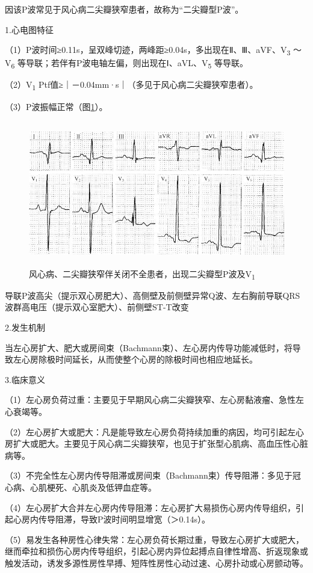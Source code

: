 因该P波常见于风心病二尖瓣狭窄患者，故称为“二尖瓣型P波”。

1.心电图特征

（1）P波时间≥0.11s，呈双峰切迹，两峰距≥0.04s，多出现在Ⅱ、Ⅲ、aVF、V\textsubscript{3}
～V\textsubscript{6}
等导联；若伴有P波电轴左偏，则出现在Ⅰ、aVL、V\textsubscript{5} 等导联。

（2）V\textsubscript{1}
Ptf值≥｜－0.04mm·s｜（多见于风心病二尖瓣狭窄患者）。

（3）P波振幅正常（图\ref{fig1-2}）。

\begin{figure}[!htbp]
 \centering
 \includegraphics[width=5.19792in,height=2.5in]{./images/Image00007.jpg}
 \captionsetup{justification=centering}
 \caption{风心病、二尖瓣狭窄伴关闭不全患者，出现二尖瓣型P波及V\textsubscript{1}}
 \label{fig1-2}
  \end{figure} 
导联P波高尖（提示双心房肥大）、高侧壁及前侧壁异常Q波、左右胸前导联QRS波群高电压（提示双心室肥大）、前侧壁ST-T改变

2.发生机制

当左心房扩大、肥大或房间束（Bachmann束）、左心房内传导功能减低时，将导致左心房除极时间延长，从而使整个心房的除极时间也相应地延长。

3.临床意义

（1）左心房负荷过重：主要见于早期风心病二尖瓣狭窄、左心房黏液瘤、急性左心衰竭等。

（2）左心房扩大或肥大：凡是能导致左心房负荷持续加重的病因，均可引起左心房扩大或肥大。主要见于风心病二尖瓣狭窄，也见于扩张型心肌病、高血压性心脏病等。

（3）不完全性左心房内传导阻滞或房间束（Bachmann束）传导阻滞：多见于冠心病、心肌梗死、心肌炎及低钾血症等。

（4）左心房扩大合并左心房内传导阻滞：左心房扩大易损伤心房内传导组织，引起心房内传导阻滞，导致P波时间明显增宽（＞0.14s）。

（5）易发生各种房性心律失常：左心房负荷长期过重，导致左心房扩大或肥大，继而牵拉和损伤心房内传导组织，引起心房内异位起搏点自律性增高、折返现象或触发活动，诱发多源性房性早搏、短阵性房性心动过速、心房扑动或心房颤动等。

